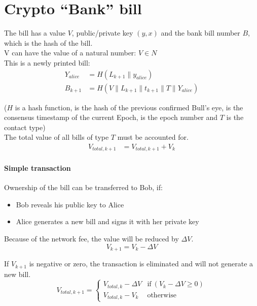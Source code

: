 \section{Crypto “Bank” bill}

The bill has a value $V$, public/private key $(y, x)$ and the bank bill number $B$, which is the hash of the bill.\\
V can have the value of a natural number: $V \in N$\\
This is a newly printed bill:
\begin{align}
 Y_{alice} & = H ( L_{k+1} \parallel y_{alice} ) \\
 B_{k+1} & = H ( V \parallel L_{k+1} \parallel t_{k+1} \parallel T \parallel Y_{alice} )
\end{align}

($H$ is a hash function, is the hash of the previous confirmed Bull’s eye,  is the consensus timestamp of the current Epoch, is the epoch number and $T$ is the contact type) \\

The total value of all bills of type $T$ must be accounted for.
\begin{align}
 V_{total,k+1} & = V_{total,k+1} + V_{k} 
\end{align}


\paragraph{Simple transaction}
Ownership of the bill can be transferred to Bob, if:
\begin{itemize}
 \item 
    Bob reveals his public key to Alice 
 \item 
    Alice generates a new bill and signs it with her private key 
\end{itemize}


Because of the network fee, the value will be reduced by ${\Delta}V$.
\begin{equation}
 V_{k+1} = V_k - {\Delta}V
\end{equation}

If $V_{k+1}$ is negative or zero, the transaction is eliminated and will not generate a new bill.
\begin{equation}
 V_{total,k+1} = 
 \begin{cases}
  V_{total,k} - {\Delta}V & \text{if} ~ ( V_k - {\Delta}V \ge 0 ) \\
  V_{total,k} - V_k & \text{otherwise}     
 \end{cases}
\end{equation}



